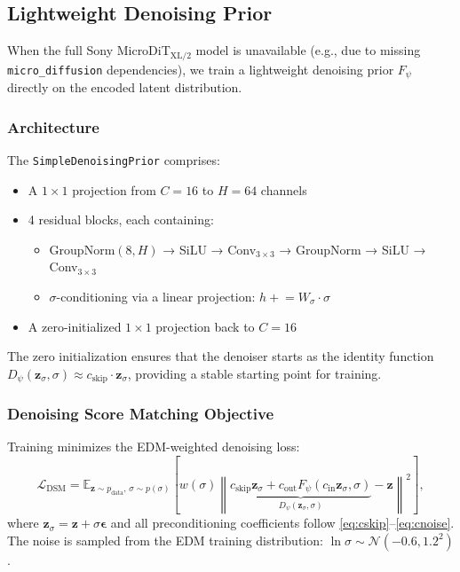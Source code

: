 \documentclass[12pt,a4paper]{article}
\newcommand{\E}{\mathbb{E}}
\newcommand{\N}{\mathcal{N}}
\newcommand{\loss}{\mathcal{L}}
\newcommand{\zvec}{\bm{z}}
\theoremstyle{definition}
\begin{document}
\subsection{Lightweight Denoising Prior}

When the full Sony MicroDiT$_{\text{XL/2}}$ model is unavailable (e.g.,
due to missing \texttt{micro\_diffusion} dependencies), we train a
lightweight denoising prior $F_{\psi}$ directly on the encoded latent
distribution.

\subsubsection{Architecture}

The \texttt{SimpleDenoisingPrior} comprises:
\begin{itemize}[nosep]
  \item A $1\times1$ projection from $C=16$ to $H=64$ channels
  \item 4 residual blocks, each containing:
    \begin{itemize}[nosep]
      \item GroupNorm$(8, H)$ → SiLU → Conv$_{3\times3}$ → GroupNorm → SiLU → Conv$_{3\times3}$
      \item $\sigma$-conditioning via a linear projection: $h \mathrel{+}= W_\sigma \cdot \sigma$
    \end{itemize}
  \item A zero-initialized $1\times1$ projection back to $C=16$
\end{itemize}
The zero initialization ensures that the denoiser starts as the identity
function $D_\psi(\zvec_\sigma, \sigma) \approx c_{\mathrm{skip}} \cdot \zvec_\sigma$,
providing a stable starting point for training.

\subsubsection{Denoising Score Matching Objective}

Training minimizes the EDM-weighted denoising loss:
\begin{equation}
  \loss_{\mathrm{DSM}} = \E_{\zvec \sim p_{\mathrm{data}},\, \sigma \sim p(\sigma)}\!\left[
    w(\sigma) \left\| \underbrace{c_{\mathrm{skip}} \zvec_\sigma + c_{\mathrm{out}} F_\psi(c_{\mathrm{in}} \zvec_\sigma, \sigma)}_{D_\psi(\zvec_\sigma, \sigma)} - \zvec \right\|^2
  \right],
  \label{eq:dsm_loss}
\end{equation}
where $\zvec_\sigma = \zvec + \sigma \bm{\epsilon}$ and all preconditioning
coefficients follow \eqref{eq:cskip}--\eqref{eq:cnoise}.  The noise is
sampled from the EDM training distribution:
$\ln\sigma \sim \N(-0.6, 1.2^2)$.
\end{document}
